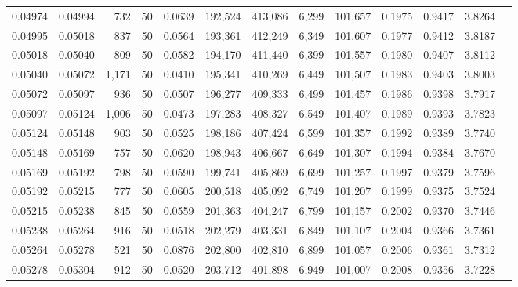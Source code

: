 \begin{tabular}{rrrrrrrrrrrrr}
0.04974 & 0.04994 &   732 &  50 &                                     0.0639 & 192,524 & 413,086 &   6,299 & 101,657 & 0.1975 & 0.9417 & 3.8264 \\
0.04995 & 0.05018 &   837 &  50 &                                     0.0564 & 193,361 & 412,249 &   6,349 & 101,607 & 0.1977 & 0.9412 & 3.8187 \\
0.05018 & 0.05040 &   809 &  50 &                                     0.0582 & 194,170 & 411,440 &   6,399 & 101,557 & 0.1980 & 0.9407 & 3.8112 \\
0.05040 & 0.05072 & 1,171 &  50 &                                     0.0410 & 195,341 & 410,269 &   6,449 & 101,507 & 0.1983 & 0.9403 & 3.8003 \\
0.05072 & 0.05097 &   936 &  50 &                                     0.0507 & 196,277 & 409,333 &   6,499 & 101,457 & 0.1986 & 0.9398 & 3.7917 \\
0.05097 & 0.05124 & 1,006 &  50 &                                     0.0473 & 197,283 & 408,327 &   6,549 & 101,407 & 0.1989 & 0.9393 & 3.7823 \\
0.05124 & 0.05148 &   903 &  50 &                                     0.0525 & 198,186 & 407,424 &   6,599 & 101,357 & 0.1992 & 0.9389 & 3.7740 \\
0.05148 & 0.05169 &   757 &  50 &                                     0.0620 & 198,943 & 406,667 &   6,649 & 101,307 & 0.1994 & 0.9384 & 3.7670 \\
0.05169 & 0.05192 &   798 &  50 &                                     0.0590 & 199,741 & 405,869 &   6,699 & 101,257 & 0.1997 & 0.9379 & 3.7596 \\
0.05192 & 0.05215 &   777 &  50 &                                     0.0605 & 200,518 & 405,092 &   6,749 & 101,207 & 0.1999 & 0.9375 & 3.7524 \\
0.05215 & 0.05238 &   845 &  50 &                                     0.0559 & 201,363 & 404,247 &   6,799 & 101,157 & 0.2002 & 0.9370 & 3.7446 \\
0.05238 & 0.05264 &   916 &  50 &                                     0.0518 & 202,279 & 403,331 &   6,849 & 101,107 & 0.2004 & 0.9366 & 3.7361 \\
0.05264 & 0.05278 &   521 &  50 &                                     0.0876 & 202,800 & 402,810 &   6,899 & 101,057 & 0.2006 & 0.9361 & 3.7312 \\
0.05278 & 0.05304 &   912 &  50 &                                     0.0520 & 203,712 & 401,898 &   6,949 & 101,007 & 0.2008 & 0.9356 & 3.7228 \\

\end{tabular}
